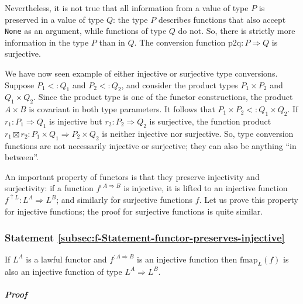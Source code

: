 Nevertheless, it is not true that all information from a value of
type $P$ is preserved in a value of type $Q$: the type $P$ describes
functions that also accept \lstinline!None! as an argument, while
functions of type $Q$ do not. So, there is strictly more information
in the type $P$ than in $Q$. The conversion function $\text{p2q}:P\Rightarrow Q$
is surjective.

We have now seen example of either injective or surjective type conversions.
Suppose $P_{1}<:Q_{1}$ and $P_{2}<:Q_{2}$, and consider the product
types $P_{1}\times P_{2}$ and $Q_{1}\times Q_{2}$. Since the product
type is one of the functor constructions, the product $A\times B$
is covariant in both type parameters. It follows that $P_{1}\times P_{2}<:Q_{1}\times Q_{2}$.
If $r_{1}:P_{1}\Rightarrow Q_{1}$ is injective but $r_{2}:P_{2}\Rightarrow Q_{2}$
is surjective, the function product $r_{1}\boxtimes r_{2}:P_{1}\times Q_{1}\Rightarrow P_{2}\times Q_{2}$
is neither injective nor surjective. So, type conversion functions
are not necessarily injective or surjective; they can also be anything
``in between''.

An important property of functors is that they preserve injectivity
and surjectivity: if a function $f^{:A\Rightarrow B}$ is injective,
it is lifted to an injective function $f^{\uparrow L}:L^{A}\Rightarrow L^{B}$;
and similarly for surjective functions $f$. Let us prove this property
for injective functions; the proof for surjective functions is quite
similar.

\subsubsection{Statement \label{subsec:f-Statement-functor-preserves-injective}\ref{subsec:f-Statement-functor-preserves-injective}}

If $L^{A}$ is a lawful functor and $f^{:A\Rightarrow B}$ is an injective
function then $\text{fmap}_{L}(f)$ is also an injective function
of type $L^{A}\Rightarrow L^{B}$. 

\subparagraph{Proof}

